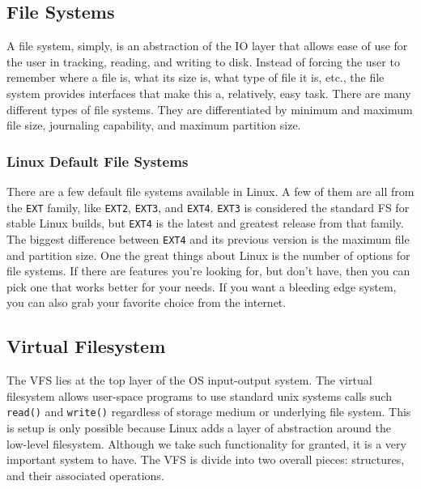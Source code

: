   \subsection{File Systems}
  A file system, simply, is an abstraction of the IO layer that allows ease of
  use for the user in tracking, reading, and writing to disk. Instead of forcing
  the user to remember where a file is, what its size is, what type of file it
  is, etc., the file system provides interfaces that make this a, relatively,
  easy task. There are many different types of file systems. They are
  differentiated by minimum and maximum file size, journaling capability, and
  maximum partition size.
  \subsubsection{Linux Default File Systems}
  There are a few default file systems available in Linux. A few of them are
  all from the \texttt{EXT} family, like \texttt{EXT2}, \texttt{EXT3}, and
  \texttt{EXT4}. \texttt{EXT3} is considered the standard FS for stable Linux
  builds, but \texttt{EXT4} is the latest and greatest release from that family.
  The biggest difference between \texttt{EXT4} and its previous version is the
  maximum file and partition size.\cite{anthonyjsimon2015}
  One the great things about Linux is the number of options for file systems.
  If there are features you're looking for, but don't have, then you can pick
  one that works better for your needs. If you want a bleeding edge system, you
  can also grab your favorite choice from the internet.

  \subsection{Virtual Filesystem}
  The VFS lies at the top layer of the OS input-output system. The virtual
  filesystem allows user-space programs to use standard unix systems calls
  such \texttt{read()} and \texttt{write()} regardless of storage medium or
  underlying file system. This is setup is only possible because Linux adds
  a layer of abstraction around the low-level filesystem. Although we take
  such functionality for granted, it is a very important system to have.
  The VFS is divide into two overall pieces: structures, and their associated
  operations. \cite{robertlove2010}

